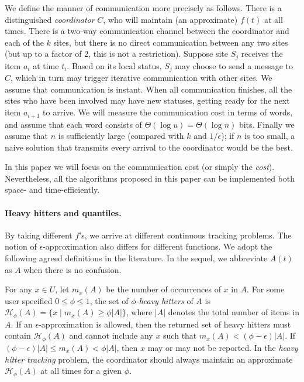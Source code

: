 \documentclass[10pt]{article}
\newcommand{\eps}{\epsilon}
\begin{document}
We define the manner of communication more precisely as follows.  There is
a distinguished {\em coordinator} $C$, who will maintain (an approximate)
$f(t)$ at all times.  There is a two-way communication channel between the
coordinator and each of the $k$ sites, but there is no direct communication
between any two sites (but up to a factor of 2, this is not a restriction).
Suppose site $S_j$ receives the item $a_i$ at time $t_i$.  Based on its
local status, $S_j$ may choose to send a message to $C$, which in turn may
trigger iterative communication with other sites.  We assume that
communication is instant.  When all communication finishes, all the sites
who have been involved may have new statuses, getting ready for the next
item $a_{i+1}$ to arrive.  We will measure the communication cost in terms
of words, and assume that each word consists of $\Theta(\log u) =
\Theta(\log n)$ bits.  Finally we assume that $n$ is sufficiently large
(compared with $k$ and $1/\eps$); if $n$ is too small, a naive solution
that transmits every arrival to the coordinator would be the best.

In this paper we will focus on the communication cost (or simply the {\em
  cost}).  Nevertheless, all the algorithms proposed in this paper can be
implemented both space- and time-efficiently.

\paragraph{Heavy hitters and quantiles.}
By taking different $f$'s, we arrive at different continuous tracking
problems.  The notion of $\eps$-approximation also differs for different
functions.  We adopt the following agreed definitions in the literature.
In the sequel, we abbreviate $A(t)$ as $A$ when there is no confusion.

For any $x\in U$, let $m_x(A)$ be the number of occurrences of $x$ in $A$.
For some user specified $0 \le \phi\le 1$, the set of {\em $\phi$-heavy
  hitters} of $A$ is $\mathcal{H}_\phi(A) = \{ x \mid m_x(A) \ge \phi
|A|\}$, where $|A|$ denotes the total number of items in $A$.  If an
$\eps$-approximation is allowed, then the returned set of heavy hitters
must contain $\mathcal{H}_\phi(A)$ and cannot include any $x$ such that
$m_x(A)<(\phi-\eps)|A|$.  If $(\phi - \eps)|A| \le m_x(A) < \phi|A|$, then
$x$ may or may not be reported.  In the {\em heavy hitter tracking}
problem, the coordinator should always maintain an approximate
$\mathcal{H}_\phi(A)$ at all times for a given $\phi$.
\end{document}
